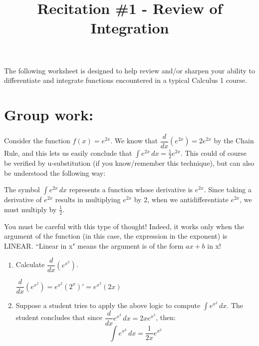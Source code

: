 \documentclass[noinstructornotes]{ximera}
\title{Recitation \#1 - Review of Integration}
\begin{document}
\begin{abstract}		\end{abstract}
\maketitle



The following worksheet is designed to help review and/or sharpen your ability to differentiate and integrate functions encountered in a typical Calculus 1 course.  


\section{Group work:}



\begin{problem}
Consider the function $f(x)=e^{2x}$.  We know that $\dfrac{d}{dx} \left( e^{2x} \right) = 2 e^{2x}$ by the Chain Rule, and this lets us easily conclude that $\int e^{2x} \, dx = \frac{1}{2} e^{2x}$.  This could of course be verified by u-substitution (if you know/remember this technique), but can also be understood the following way:

The symbol $\int e^{2x} \, dx$ represents a function whose derivative is $e^{2x}$.  Since taking a derivative of $e^{2x}$ results in multiplying $e^{2x}$ by 2, when we antidifferentiate $e^{2x}$, we must multiply by $\frac{1}{2}$.  

You must be careful with this type of thought!  Indeed, it works only when the argument of the function (in this case, the expression in the exponent) is LINEAR.  ``Linear in x" means the argument is of the form $ax+b$ in x!

	\begin{enumerate}
	
	\item  Calculate $\dfrac{d}{dx} \left(e^{x^2} \right) $.
	\begin{freeResponse}
		$\dfrac{d}{dx} \left(e^{x^2} \right) = e^{x^2} \left( 2^x \right)' = e^{x^2} \left( 2x \right)$
	\end{freeResponse}
			
		
	\item Suppose a student tries to apply the above logic to compute $\int e^{x^2} \, dx$.  The student concludes that since $\dfrac{d}{dx} e^{x^2} \, dx = 2x e^{x^2} $, then: 
\begin{equation}
 \int e^{x^2} \, dx = \dfrac{1}{2x} e^{x^2} \label{bad1}
\end{equation}


\end{enumerate}
\end{problem}
\end{document}
